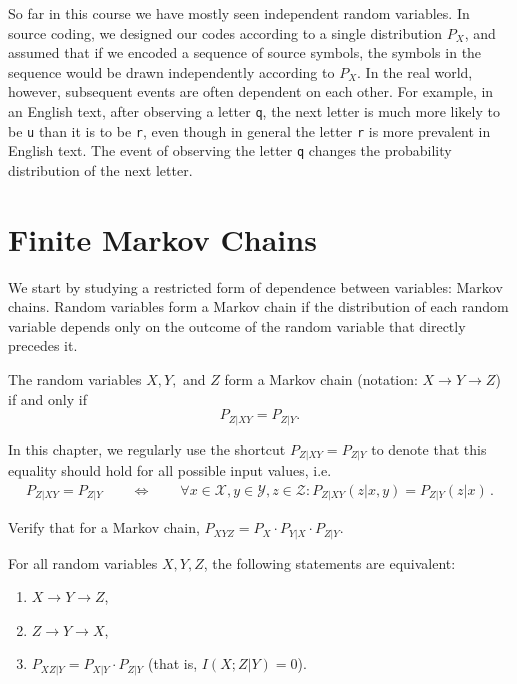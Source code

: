 So far in this course we have mostly seen independent random variables. In source coding, we designed our codes according to a single distribution $P_X$, and assumed that if we encoded a sequence of source symbols, the symbols in the sequence would be drawn independently according to $P_X$. In the real world, however, subsequent events are often dependent on each other. For example, in an English text, after observing a letter \texttt{q}, the next letter is much more likely to be \texttt{u} than it is to be \texttt{r}, even though in general the letter \texttt{r} is more prevalent in English text. The event of observing the letter \texttt{q} changes the probability distribution of the next letter.

\section{Finite Markov Chains}\label{sec:three-var-MC}
We start by studying a restricted form of dependence between variables: Markov chains. Random variables form a Markov chain if the distribution of each random variable depends only on the outcome of the random variable that directly precedes it.

\begin{definition}\label{def:Markov-chain}
The random variables $X, Y,$ and $Z$ form a Markov chain (notation: $X \to Y \to Z$) if and only if
\[
P_{Z|XY} = P_{Z|Y}.
\]
\end{definition}
In this chapter, we regularly use the shortcut $P_{Z|XY} = P_{Z|Y}$ to denote that this equality should hold for all possible input values, i.e.
\begin{align}
P_{Z|XY} = P_{Z|Y} \qquad \Leftrightarrow \qquad \forall x \in \mathcal{X}, y \in \mathcal{Y}, z \in \mathcal{Z}: P_{Z|XY}(z|x,y) = P_{Z|Y}(z|x) \, .
\end{align}

\begin{exercise}
Verify that for a Markov chain, $P_{XYZ} = P_X \cdot P_{Y|X} \cdot P_{Z|Y}$.
\end{exercise}

\begin{proposition}\label{prop:markov-chains}
For all random variables $X,Y,Z$, the following statements are equivalent:
\begin{enumerate}[label=\alph*.]
\item $X \to Y \to Z$,
\item $Z \to Y \to X$,
\item $P_{XZ|Y} = P_{X|Y} \cdot P_{Z|Y}$ (that is, $I(X;Z|Y) = 0$).
\end{enumerate}
\end{proposition}

